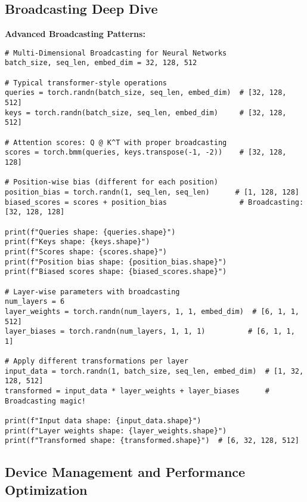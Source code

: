 \documentclass[11pt,a4paper]{book}
\begin{document}
\subsection{Broadcasting Deep Dive}

\textbf{Advanced Broadcasting Patterns:}
\begin{verbatim}
# Multi-Dimensional Broadcasting for Neural Networks
batch_size, seq_len, embed_dim = 32, 128, 512

# Typical transformer-style operations
queries = torch.randn(batch_size, seq_len, embed_dim)  # [32, 128, 512]
keys = torch.randn(batch_size, seq_len, embed_dim)     # [32, 128, 512]

# Attention scores: Q @ K^T with proper broadcasting
scores = torch.bmm(queries, keys.transpose(-1, -2))    # [32, 128, 128]

# Position-wise bias (different for each position)
position_bias = torch.randn(1, seq_len, seq_len)      # [1, 128, 128]
biased_scores = scores + position_bias                 # Broadcasting: [32, 128, 128]

print(f"Queries shape: {queries.shape}")
print(f"Keys shape: {keys.shape}")
print(f"Scores shape: {scores.shape}")
print(f"Position bias shape: {position_bias.shape}")
print(f"Biased scores shape: {biased_scores.shape}")

# Layer-wise parameters with broadcasting
num_layers = 6
layer_weights = torch.randn(num_layers, 1, 1, embed_dim)  # [6, 1, 1, 512]
layer_biases = torch.randn(num_layers, 1, 1, 1)          # [6, 1, 1, 1]

# Apply different transformations per layer
input_data = torch.randn(1, batch_size, seq_len, embed_dim)  # [1, 32, 128, 512]
transformed = input_data * layer_weights + layer_biases      # Broadcasting magic!

print(f"Input data shape: {input_data.shape}")
print(f"Layer weights shape: {layer_weights.shape}")
print(f"Transformed shape: {transformed.shape}")  # [6, 32, 128, 512]
\end{verbatim}

\subsection{Device Management and Performance Optimization}
\end{document}

